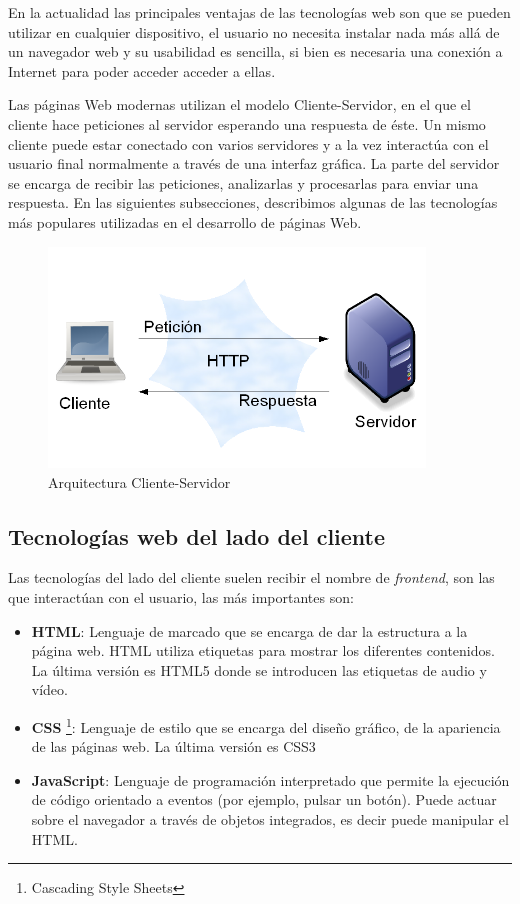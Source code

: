 En la actualidad las principales ventajas de las tecnologías web son que se pueden utilizar en cualquier dispositivo, el usuario no necesita instalar nada más allá de un navegador web y su usabilidad es sencilla, si bien es necesaria una conexión a Internet para poder acceder acceder a ellas\cite{juan}.

Las páginas Web modernas utilizan el modelo Cliente-Servidor, en el que el cliente hace peticiones al servidor esperando una respuesta de éste. Un mismo cliente puede estar conectado con varios servidores y a la vez interactúa con el usuario final normalmente a través de una interfaz gráfica. La parte del servidor se encarga de recibir las peticiones, analizarlas y procesarlas para enviar una respuesta. En las siguientes subsecciones, describimos algunas de las tecnologías más populares utilizadas en el desarrollo de páginas Web.

\begin{figure}[H]
    \centering
    \includegraphics[width=10cm, keepaspectratio]{img/arquitectura.png}
    \caption{Arquitectura Cliente-Servidor}
    \label{fig:arquitectura}
\end{figure}

\subsection{Tecnologías web del lado del cliente}
Las tecnologías del lado del cliente suelen recibir el nombre de \textit{frontend}, son las que interactúan con el usuario, las más importantes son:

\begin{itemize}
  \item \textbf{HTML}:  Lenguaje de marcado que se encarga de dar la estructura a la página web. HTML utiliza etiquetas para mostrar los diferentes contenidos. La última versión es HTML5 donde se introducen las etiquetas de audio y vídeo.
  \item \textbf{CSS} \footnote{Cascading Style Sheets}: Lenguaje de estilo que se encarga del diseño gráfico, de la apariencia de las páginas web. La última versión es CSS3
  \item \textbf{JavaScript}: Lenguaje de programación interpretado que permite la ejecución de código orientado a eventos (por ejemplo, pulsar un botón). Puede actuar sobre el navegador a través de objetos integrados, es decir puede manipular el HTML.
\end{itemize}

